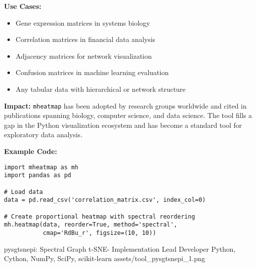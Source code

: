 \textbf{Use Cases:}
\begin{itemize}[leftmargin=1.2em, itemsep=0.1em]
  \item Gene expression matrices in systems biology
  \item Correlation matrices in financial data analysis
  \item Adjacency matrices for network visualization
  \item Confusion matrices in machine learning evaluation
  \item Any tabular data with hierarchical or network structure
\end{itemize}

\textbf{Impact:} \texttt{mheatmap} has been adopted by research groups worldwide and cited in publications spanning biology, computer science, and data science. The tool fills a gap in the Python visualization ecosystem and has become a standard tool for exploratory data analysis.

\vspace{1em}

\textbf{Example Code:}
\begin{verbatim}
import mheatmap as mh
import pandas as pd

# Load data
data = pd.read_csv('correlation_matrix.csv', index_col=0)

# Create proportional heatmap with spectral reordering
mh.heatmap(data, reorder=True, method='spectral',
           cmap='RdBu_r', figsize=(10, 10))
\end{verbatim}

\newpage


\ProjectEntry
{pysgtsnepi: Spectral Graph t-SNE-\textPi{} Implementation}
{Lead Developer}
{Python, Cython, NumPy, SciPy, scikit-learn}
{
}
{assets/tool_pysgtsnepi_1.png}
{ \quad {}}
{  }

